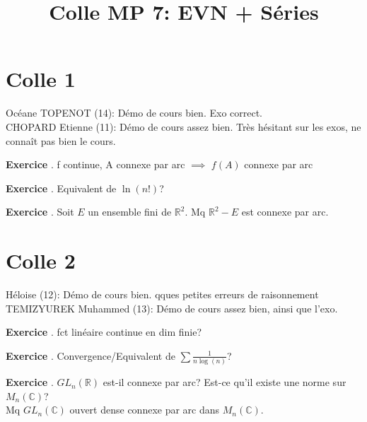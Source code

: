 \documentclass[10pt,a4paper]{article}
\title{Colle MP 7: EVN + Séries}
\newcounter{question}
\newcounter{exo}
\newenvironment{exo}{\vspace{0.5cm}\setcounter{question}{0}\addtocounter{exo}{1} \noindent \textbf{Exercice \theexo}. \normalsize }{\par}
\begin{document}
	\maketitle
	
	\section*{Colle 1}
	Océane TOPENOT (14): Démo de cours bien. Exo correct.\\
	CHOPARD Etienne (11): Démo de cours assez bien. Très hésitant sur les exos, ne connaît pas bien le cours.\\
	
	\begin{exo}
		f continue, A connexe par arc $\implies$ $f(A)$ connexe par arc
	\end{exo}

	\begin{exo}
		Equivalent de $\ln(n!)$?
	\end{exo}
	
	\begin{exo}
		Soit $E$ un ensemble fini de $\mathbb{R}^2$. Mq $\mathbb{R}^2 - E$ est connexe par arc.
	\end{exo}

	\section*{Colle 2}
	\setcounter{exo}{0}
	Héloise (12): Démo de cours bien. qques petites erreurs de raisonnement\\
	TEMIZYUREK Muhammed (13): Démo de cours assez bien, ainsi que l'exo.\\
	
	\begin{exo}
		fct linéaire continue en dim finie?
	\end{exo}

	\begin{exo}
		Convergence/Equivalent de $\sum \frac{1}{n\log(n)}$?
	\end{exo}
	
	\begin{exo}
		$GL_n(\mathbb{R})$ est-il connexe par arc?
		Est-ce qu'il existe une norme sur $M_n(\mathbb{C})$?\\
		Mq $GL_n(\mathbb{C})$ ouvert dense connexe par arc dans $M_n(\mathbb{C})$. 
	\end{exo}

	
\end{document}
